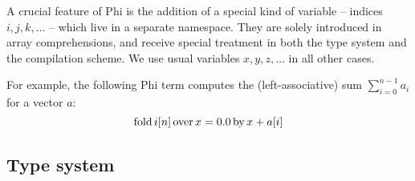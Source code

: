 A crucial feature of Phi is the addition of a special kind of variable -- indices $i, j, k, \dots$ -- which live in a separate namespace. They are solely introduced in array comprehensions, and receive special treatment in both the type system and the compilation scheme. We use usual variables $x, y, z, \dots$ in all other cases.

For example, the following Phi term computes the (left-associative) sum $\sum_{i=0}^{n-1} a_i$ for a vector $a$:
$$ \mathrm{fold}\,{i}[{n}]\,\mathrm{over}\,{x} = {0.0}\,\mathrm{by}\,{x + a[i]} $$

\subsection{Type system}

\newcommand{\phifloattype}{\mathrm{Float}}
\newcommand{\phiinttype}{\mathrm{Int}}
\newcommand{\phinattype}{\phiinttype}
\newcommand{\phibooltype}{\mathrm{Bool}}
\newcommand{\phivectype}[1]{\Box{#1}}
\newcommand{\phipairtype}[2]{{#1} \times {#2}}

